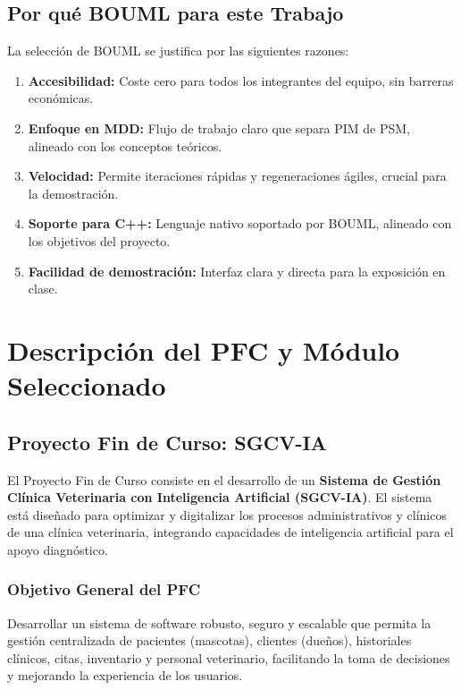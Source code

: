 \documentclass[12pt,a4paper]{article}
\begin{document}
\subsection{Por qué BOUML para este Trabajo}

La selección de BOUML se justifica por las siguientes razones:

\begin{enumerate}
    \item \textbf{Accesibilidad:} Coste cero para todos los integrantes del equipo, sin barreras económicas.
    \item \textbf{Enfoque en MDD:} Flujo de trabajo claro que separa PIM de PSM, alineado con los conceptos teóricos.
    \item \textbf{Velocidad:} Permite iteraciones rápidas y regeneraciones ágiles, crucial para la demostración.
    \item \textbf{Soporte para C++:} Lenguaje nativo soportado por BOUML, alineado con los objetivos del proyecto.
    \item \textbf{Facilidad de demostración:} Interfaz clara y directa para la exposición en clase.
\end{enumerate}

\newpage
\section{Descripción del PFC y Módulo Seleccionado}

\subsection{Proyecto Fin de Curso: SGCV-IA}

El Proyecto Fin de Curso consiste en el desarrollo de un \textbf{Sistema de Gestión Clínica Veterinaria con Inteligencia Artificial (SGCV-IA)}. El sistema está diseñado para optimizar y digitalizar los procesos administrativos y clínicos de una clínica veterinaria, integrando capacidades de inteligencia artificial para el apoyo diagnóstico.

\subsubsection{Objetivo General del PFC}

Desarrollar un sistema de software robusto, seguro y escalable que permita la gestión centralizada de pacientes (mascotas), clientes (dueños), historiales clínicos, citas, inventario y personal veterinario, facilitando la toma de decisiones y mejorando la experiencia de los usuarios.
\end{document}
